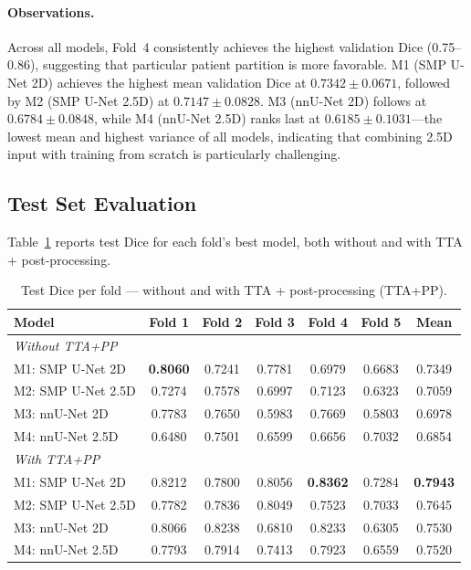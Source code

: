 \documentclass[11pt,a4paper]{article}
\begin{document}
\paragraph{Observations.}
Across all models, Fold~4 consistently achieves the highest validation Dice (0.75--0.86), suggesting that particular patient partition is more favorable. M1 (SMP U-Net 2D) achieves the highest mean validation Dice at $0.7342 \pm 0.0671$, followed by M2 (SMP U-Net 2.5D) at $0.7147 \pm 0.0828$. M3 (nnU-Net 2D) follows at $0.6784 \pm 0.0848$, while M4 (nnU-Net 2.5D) ranks last at $0.6185 \pm 0.1031$---the lowest mean and highest variance of all models, indicating that combining 2.5D input with training from scratch is particularly challenging.

\subsection{Test Set Evaluation}

Table~\ref{tab:test_dice} reports test Dice for each fold's best model, both without and with TTA + post-processing.

\begin{table}[H]
\centering
\caption{Test Dice per fold --- without and with TTA + post-processing (TTA+PP).}
\label{tab:test_dice}
\begin{tabular}{lcccccc}
\toprule
\textbf{Model} & \textbf{Fold 1} & \textbf{Fold 2} & \textbf{Fold 3} & \textbf{Fold 4} & \textbf{Fold 5} & \textbf{Mean} \\
\midrule
\multicolumn{7}{l}{\textit{Without TTA+PP}} \\
\midrule
M1: SMP U-Net 2D    & \textbf{0.8060} & 0.7241 & 0.7781 & 0.6979 & 0.6683 & 0.7349 \\
M2: SMP U-Net 2.5D  & 0.7274 & 0.7578 & 0.6997 & 0.7123 & 0.6323 & 0.7059 \\
M3: nnU-Net 2D      & 0.7783 & 0.7650 & 0.5983 & 0.7669 & 0.5803 & 0.6978 \\
M4: nnU-Net 2.5D    & 0.6480 & 0.7501 & 0.6599 & 0.6656 & 0.7032 & 0.6854 \\
\midrule
\multicolumn{7}{l}{\textit{With TTA+PP}} \\
\midrule
M1: SMP U-Net 2D    & 0.8212 & 0.7800 & 0.8056 & \textbf{0.8362} & 0.7284 & \textbf{0.7943} \\
M2: SMP U-Net 2.5D  & 0.7782 & 0.7836 & 0.8049 & 0.7523 & 0.7033 & 0.7645 \\
M3: nnU-Net 2D      & 0.8066 & 0.8238 & 0.6810 & 0.8233 & 0.6305 & 0.7530 \\
M4: nnU-Net 2.5D    & 0.7793 & 0.7914 & 0.7413 & 0.7923 & 0.6559 & 0.7520 \\
\bottomrule
\end{tabular}
\end{table}
\end{document}
